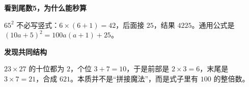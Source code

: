\clearpage
\begin{statementbox}
\textbf{\textcolor{CStatement}{看到尾数5，为什么能秒算}}
\par\medskip
\begin{center}

\end{center}
\medskip
$65^2$ 不必写竖式：$6\times(6+1)=42$，后面接 $25$，结果 $4225$。通用公式是 $(10a+5)^2=100a(a+1)+25$。
\end{statementbox}
\clearpage
\begin{statementbox}
\textbf{\textcolor{CStatement}{发现共同结构}}
\par\medskip
\begin{center}

\end{center}
\medskip
$23\times27$ 的十位都为 $2$，个位 $3+7=10$，于是前部是 $2\times3=6$，末尾是 $3\times7=21$，合成 $621$。本质并不是“拼接魔法”，而是式子里有 $100$ 的整倍数。
\end{statementbox}

